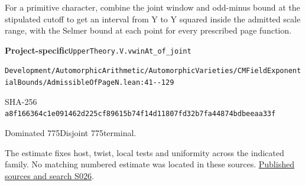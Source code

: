 
\begin{formalstatement}[D536]\label{decomp:D536}
For a primitive character, combine the joint window and odd-minus bound at the stipulated cutoff to get an interval from Y to Y squared inside the admitted scale range, with the Selmer bound at each point for every prescribed page function.
\end{formalstatement}
{\small\raggedright\noindent\textsf{\bfseries Project-specific}\quad \nolinkurl{UpperTheory.V.vwinAt_of_joint}\par\noindent \nolinkurl{Development/AutomorphicArithmetic/AutomorphicVarieties/CMFieldExponentialBounds/AdmissibleOfPageN.lean:41--129}\par\noindent SHA-256 \nolinkurl{a8f166364c1e091462d225cf89615b74f14d11807fd32b7fa44874bdbeeaa33f}\par\noindent Dominated 775\quad Disjoint 775\quad terminal.\par}
The estimate fixes host, twist, local tests and uniformity across the indicated family. No matching numbered estimate was located in these sources.
\hyperref[lit:S026]{Published sources and search S026}.
